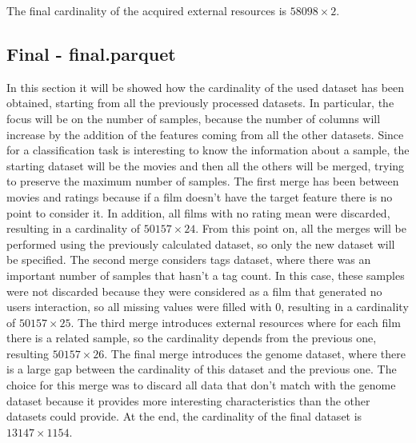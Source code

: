 \documentclass[../main]{subfiles}
\begin{document}
The final cardinality of the acquired external resources is $58098 \times 2$.

\subsection*{Final - final.parquet}
In this section it will be showed how the cardinality of the used dataset has been obtained, starting from all the previously processed datasets.
In particular, the focus will be on the number of samples, because the number of columns will increase by the addition of the features coming from all the other datasets.
Since for a classification task is interesting to know the information about a sample, the starting dataset will be the movies and then all the others will be merged, trying to preserve the maximum number of samples.
The first merge has been between movies and ratings because if a film doesn’t have the target feature there is no point to consider it.
In addition, all films with no rating mean were discarded, resulting in a cardinality of $50157 \times 24$.
From this point on, all the merges will be performed using the previously calculated dataset, so only the new dataset will be specified.
The second merge considers tags dataset, where there was an important number of samples that hasn't a tag count.
In this case, these samples were not discarded because they were considered as a film that generated no users interaction, so all missing values were filled with 0, resulting in a cardinality of $50157 \times 25$.
The third merge introduces external resources where for each film there is a related sample, so the cardinality depends from the previous one, resulting $50157 \times 26$.
The final merge introduces the genome dataset, where there is a large gap between the cardinality of this dataset and the previous one.
The choice for this merge was to discard all data
that don't match with the genome dataset because it provides more interesting characteristics than the other datasets could provide.
At the end, the cardinality of the final dataset is $13147 \times 1154$.
\end{document}
